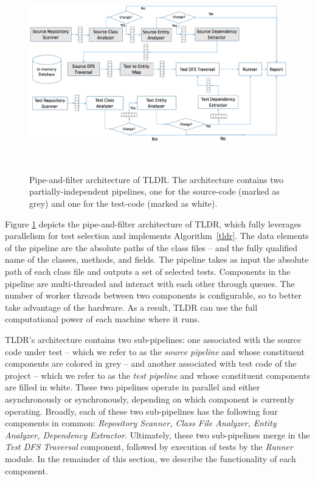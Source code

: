 \begin{figure}
\begin{center}
  \includegraphics[width=18cm,height=8.5cm]{arch}
  \caption{Pipe-and-filter architecture of TLDR. The architecture contains two partially-independent pipelines, one for the source-code (marked as grey) and one for the test-code (marked as white).}
  \label{fig:tldr}
\end{center}
\end{figure}

Figure \ref{fig:tldr} depicts the pipe-and-filter architecture of TLDR, which fully leverages parallelism for test selection and implements Algorithm~\ref{tldr}. The data elements of the pipeline are the absolute paths of the class files -- and the fully qualified name of the classes, methods, and fields. The pipeline takes as input the absolute path of each class file and outputs a set of selected tests. Components in the pipeline are multi-threaded and interact with each other through queues. The number of worker threads between two components is configurable, so to better take advantage of the hardware. As a result, TLDR can use the full computational power of each machine where it runs. 

TLDR's architecture contains two sub-pipelines: one associated with the source code under test -- which we refer to as the \textit{source pipeline} and whose constituent components are colored in grey -- and another associated with test code of the project -- which we refer to as the \textit{test pipeline} and whose constituent components are filled in white. These two pipelines operate in parallel and either asynchronously or synchronously, depending on which component is currently operating. Broadly, each of these two sub-pipelines has the following four components in common: \textit{Repository Scanner, Class File Analyzer, Entity Analyzer, Dependency Extractor}. Ultimately, these two sub-pipelines merge in the \textit{Test DFS Traversal} component, followed by execution of tests by the \textit{Runner} module. In the remainder of this section, we describe the functionality of each component.  

